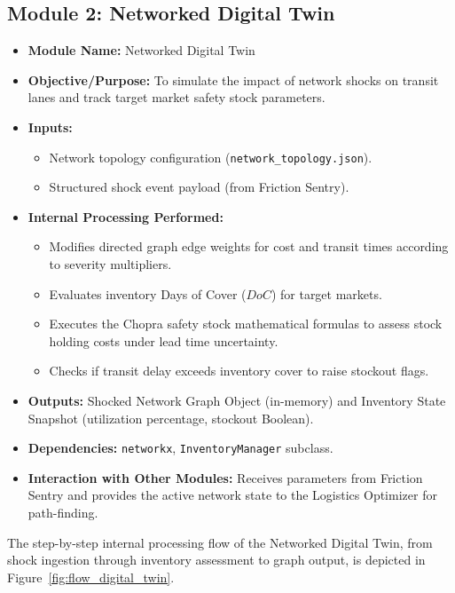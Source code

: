 \subsection[Module 2: Networked Digital Twin]{Module 2: Networked Digital Twin}
\begin{itemize}
    \item \textbf{Module Name:} Networked Digital Twin
    \item \textbf{Objective/Purpose:} To simulate the impact of network shocks on transit lanes and track target market safety stock parameters.
    \item \textbf{Inputs:}
    \begin{itemize}
        \item Network topology configuration (\texttt{network\_topology.json}).
        \item Structured shock event payload (from Friction Sentry).
    \end{itemize}
    \item \textbf{Internal Processing Performed:}
    \begin{itemize}
        \item Modifies directed graph edge weights for cost and transit times according to severity multipliers.
        \item Evaluates inventory Days of Cover ($DoC$) for target markets.
        \item Executes the Chopra safety stock mathematical formulas to assess stock holding costs under lead time uncertainty.
        \item Checks if transit delay exceeds inventory cover to raise stockout flags.
    \end{itemize}
    \item \textbf{Outputs:} Shocked Network Graph Object (in-memory) and Inventory State Snapshot (utilization percentage, stockout Boolean).
    \item \textbf{Dependencies:} \texttt{networkx}, \texttt{InventoryManager} subclass.
    \item \textbf{Interaction with Other Modules:} Receives parameters from Friction Sentry and provides the active network state to the Logistics Optimizer for path-finding.
\end{itemize}
The step-by-step internal processing flow of the Networked Digital Twin, from shock ingestion through inventory assessment to graph output, is depicted in Figure~\ref{fig:flow_digital_twin}.

